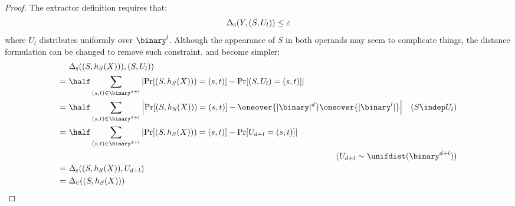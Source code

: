 \begin{proof}
    The extractor definition requires that:
    \[
        \Delta_\textsc{s}(Y, (S, U_l)) \leq \varepsilon
    \]
    where $U_l$ distributes uniformly over $\binary^l$. Although the appearance of $S$ in both operands may seem to complicate things, the distance formulation can be changed to remove such constraint, and become simpler:
    \begin{align*}
         &\ \statdist((S, h_S(X))), (S, U_l))                                                                                               &                \\
        =&\ \half \sum_{(s, t) \in \binary^{d + l}} \left| \Pr[(S, h_S(X))) = (s, t)] - \Pr[(S, U_l) = (s, t)] \right|                      &                \\
        =&\ \half \sum_{(s, t) \in \binary^{d + l}} \left| \Pr[(S, h_S(X))) = (s, t)] - \oneover{|\binary|^d} \oneover{|\binary^l|} \right| & (S \indep U_l) \\
        =&\ \half \sum_{(s, t) \in \binary^{d + l}} \left| \Pr[(S, h_S(X))) = (s, t)] - \Pr[U_{d + l} = (s, t)] \right|                     &                \\
         &                                                                                          & \mathllap{(U_{d + l} \sim \unifdist(\binary^{d + l}))} \\
        =&\ \statdist((S, h_S(X)), U_{d + l})                                                                                               &                \\
        =&\ \sdtu((S, h_S(X)))                                                                                                              &                \\
    \end{align*}
    

\end{proof}
